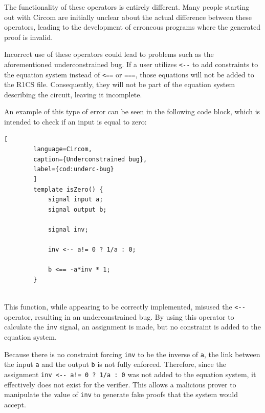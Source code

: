 \documentclass[a4paper,12pt]{report}
\begin{document}
	\vspace{0.2cm}
	\noindent The functionality of these operators is entirely different. Many people starting out with Circom are initially unclear about the actual difference between these operators, leading to the development of erroneous programs where the generated proof is invalid.
	
	\vspace{0.2cm}
	\noindent Incorrect use of these operators could lead to problems such as the aforementioned underconstrained bug. If a user utilizes \texttt{<-}\texttt{-} to add constraints to the equation system instead of \texttt{<==} or \texttt{===}, those equations will not be added to the R1CS file. Consequently, they will not be part of the equation system describing the circuit, leaving it incomplete.
	
	\vspace{0.2cm}
	\noindent An example of this type of error can be seen in the following code block, which is intended to check if an input is equal to zero:
	
	\vspace{0.2cm}
	\begin{lstlisting}[
		language=Circom, 
		caption={Underconstrained bug}, 
		label={cod:underc-bug}
		]
		template isZero() {
			signal input a;
			signal output b;
			
			signal inv;
			
			inv <-- a!= 0 ? 1/a : 0;
			
			b <== -a*inv * 1;
		}
		
	\end{lstlisting}
	
	
	\vspace{0.2cm}
	\noindent This function, while appearing to be correctly implemented, misused the \texttt{<-}\texttt{-} operator, resulting in an underconstrained bug. By using this operator to calculate the \texttt{inv} signal, an assignment is made, but no constraint is added to the equation system. 
	
	\vspace{0.2cm}
	\noindent Because there is no constraint forcing \texttt{inv} to be the inverse of \texttt{a}, the link between the input \texttt{a} and the output \texttt{b} is not fully enforced. Therefore, since the assignment \texttt{inv <-}\texttt{- a!= 0 ? 1/a : 0} was not added to the equation system, it effectively does not exist for the verifier. This allows a malicious prover to manipulate the value of \texttt{inv} to generate fake proofs that the system would accept.
	
\end{document}
